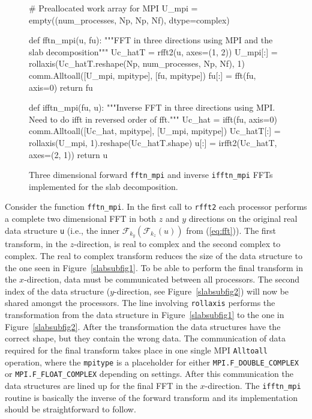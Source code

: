\documentclass[final,1p,times]{elsarticle}
\newcommand{\inpyth}{\lstinline[style=inlinestyle]} %[]%
\begin{document}
\begin{figure}
\begin{python}
# Preallocated work array for MPI
U_mpi = empty((num_processes, Np, Np, Nf), dtype=complex)

def fftn_mpi(u, fu):
    """FFT in three directions using MPI and the slab decomposition"""
    Uc_hatT = rfft2(u, axes=(1, 2))
    U_mpi[:] = rollaxis(Uc_hatT.reshape(Np, num_processes, Np, Nf), 1)
    comm.Alltoall([U_mpi, mpitype], [fu, mpitype])
    fu[:] = fft(fu, axis=0)
    return fu

def ifftn_mpi(fu, u):
    """Inverse FFT in three directions using MPI.
       Need to do ifft in reversed order of fft."""
    Uc_hat = ifft(fu, axis=0)
    comm.Alltoall([Uc_hat, mpitype], [U_mpi, mpitype])
    Uc_hatT[:] = rollaxis(U_mpi, 1).reshape(Uc_hatT.shape)
    u[:] = irfft2(Uc_hatT, axes=(2, 1))
    return u
\end{python}
\caption{Three dimensional forward \inpyth{fftn_mpi} and inverse \inpyth{ifftn_mpi} FFTs implemented for the slab decomposition.}
\label{fig:fftn_slab}
\end{figure}
Consider the function \inpyth{fftn_mpi}. In the first call to \inpyth{rfft2} each processor performs a
complete two dimensional FFT in both $z$ and $y$ directions on the original real data structure \inpyth{u}
(i.e., the inner $\mathcal{F}_{k_y}(\mathcal{F}_{k_z}(u))$ from (\ref{eq:fft})).
The first transform, in the $z$-direction, is real to complex and the second complex to complex. The real
to complex transform reduces the size of the data structure to the one seen in Figure~\ref{slabsubfig1}.
To be able to perform the final transform in the $x$-direction, data must be communicated between all
processors. The second index of the data structure ($y$-direction, see Figure~\ref{slabsubfig2}) will now be
shared amongst the processors. The line involving \inpyth{rollaxis} performs
the transformation from the data structure in Figure~\ref{slabsubfig1} to the one in Figure~\ref{slabsubfig2}.
After the transformation the data structures have the correct shape, but they contain the wrong data. The
communication of data required for the final transform takes place in one single MPI \inpyth{Alltoall}
operation, where the \inpyth{mpitype} is a placeholder for either \inpyth{MPI.F_DOUBLE_COMPLEX} or
\inpyth{MPI.F_FLOAT_COMPLEX} depending on settings. After this communication the data structures are lined
up for the final FFT in the $x$-direction. The \inpyth{ifftn_mpi} routine is basically the inverse of the
forward transform and its implementation should be straightforward to follow.
\end{document}

